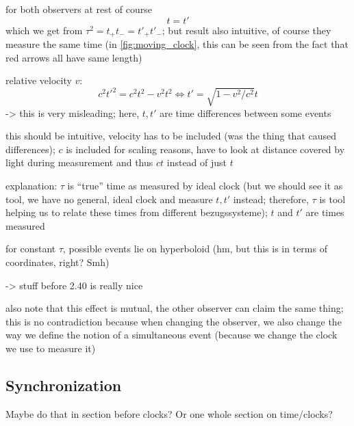 \begin{ex}\label{ex:mov_obs}
for both observers at rest of course
\begin{equation*}
t = t'
\end{equation*}
which we get from $\tau^2 = t_+ t_- = t'_+ t'_-$; but result also intuitive, of course they measure the same time (in \ref{fig:moving_clock}, this can be seen from the fact that red arrows all have same length)

relative velocity $v$:
\begin{equation*}
c^2 t'^2 = c^2 t^2 - v^2 t^2 \Leftrightarrow t' = \sqrt{1 - v^2 / c^2} t %
\end{equation*}
-> this is very misleading; here, $t, t'$ are time differences between some events

this should be intuitive, velocity has to be included (was the thing that caused differences); $c$ is included for scaling reasons, have to look at distance covered by light during measurement and thus $c t$ instead of just $t$

explanation: $\tau$ is \enquote{true} time as measured by ideal clock (but we should see it as tool, we have no general, ideal clock and measure $t, t'$ instead; therefore, $\tau$ is tool helping us to relate these times from different bezugssysteme); $t$ and $t'$ are times measured


for constant $\tau$, possible events lie on hyperboloid (hm, but this is in terms of coordinates, right? Smh)

-> stuff before 2.40 is really nice



also note that this effect is mutual, the other observer can claim the same thing; this is no contradiction because when changing the observer, we also change the way we define the notion of a simultaneous event (because we change the clock we use to measure it)
\end{ex}





		\subsection{Synchronization}
Maybe do that in section before clocks? Or one whole section on time/clocks?



